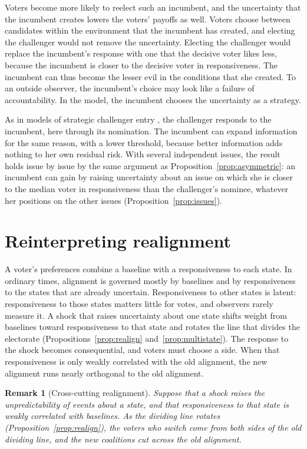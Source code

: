 \documentclass[12pt,letterpaper]{article}
\newtheorem{remark}{Remark}
\begin{document}
Voters become more likely to reelect such an incumbent, and the uncertainty that the incumbent creates lowers the voters' payoffs as well. Voters choose between candidates within the environment that the incumbent has created, and electing the challenger would not remove the uncertainty. Electing the challenger would replace the incumbent's response with one that the decisive voter likes less, because the incumbent is closer to the decisive voter in responsiveness. The incumbent can thus become the lesser evil in the conditions that she created. To an outside observer, the incumbent's choice may look like a failure of accountability. In the model, the incumbent chooses the uncertainty as a strategy.

As in models of strategic challenger entry \citep{GordonHuberLanda2007}, the challenger responds to the incumbent, here through its nomination. The incumbent can expand information for the same reason, with a lower threshold, because better information adds nothing to her own residual risk. With several independent issues, the result holds issue by issue by the same argument as Proposition~\ref{prop:asymmetric}: an incumbent can gain by raising uncertainty about an issue on which she is closer to the median voter in responsiveness than the challenger's nominee, whatever her positions on the other issues (Proposition~\ref{prop:issues}).

\section{Reinterpreting realignment}\label{sec:evidence}

A voter's preferences combine a baseline with a responsiveness to each state. In ordinary times, alignment is governed mostly by baselines and by responsiveness to the states that are already uncertain. Responsiveness to other states is latent: responsiveness to those states matters little for votes, and observers rarely measure it. A shock that raises uncertainty about one state shifts weight from baselines toward responsiveness to that state and rotates the line that divides the electorate (Propositions~\ref{prop:realign} and~\ref{prop:multistate}). The response to the shock becomes consequential, and voters must choose a side. When that responsiveness is only weakly correlated with the old alignment, the new alignment runs nearly orthogonal to the old alignment.

\begin{remark}[Cross-cutting realignment]\label{rem:crosscut}
Suppose that a shock raises the unpredictability of events about a state, and that responsiveness to that state is weakly correlated with baselines. As the dividing line rotates (Proposition~\ref{prop:realign}), the voters who switch come from both sides of the old dividing line, and the new coalitions cut across the old alignment.
\end{remark}
\end{document}
